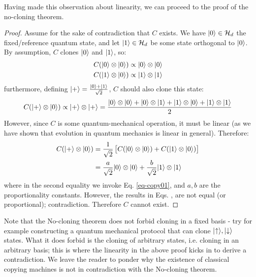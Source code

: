 Having made this observation about linearity, we can proceed to the proof of the no-cloning theorem.
\begin{proof}
    Assume for the sake of contradiction that $C$ exists. We have $\lvert 0 \rangle \in \mathcal{H}_d$ the fixed/reference quantum state, and let $\lvert 1 \rangle \in \mathcal{H}_d$ be some state orthogonal to $\lvert 0 \rangle$. By assumption, $C$ clones $\lvert 0 \rangle$ and $\lvert 1 \rangle$, so:
    \begin{equation}\label{eq-copy01}
        \begin{split}
            C(\lvert 0 \rangle \otimes \lvert 0 \rangle) &\propto \lvert 0 \rangle \otimes \lvert 0 \rangle
            \\ C(\lvert 1 \rangle \otimes \lvert 0 \rangle) &\propto \lvert 1 \rangle \otimes \lvert 1 \rangle
        \end{split}
    \end{equation}
    furthermore, defining $\lvert + \rangle = \frac{\lvert 0 \rangle + \lvert 1 \rangle}{\sqrt{2}}$, $C$ should also clone this state:
    \begin{equation}\label{eq-cloneplus1}
        C(\lvert + \rangle \otimes \lvert 0 \rangle) \propto \lvert + \rangle \otimes \lvert + \rangle = \frac{\lvert 0 \rangle \otimes \lvert 0 \rangle + \lvert 0 \rangle \otimes \lvert 1 \rangle + \lvert 1 \rangle \otimes \lvert 0 \rangle + \lvert 1 \rangle \otimes \lvert 1 \rangle}{2}
    \end{equation}
    However, since $C$ is some quantum-mechanical operation, it must be linear (as we have shown that evolution in quantum mechanics is linear in general). Therefore:
    \begin{equation}\label{eq-cloneplus2}
        \begin{split}
            C(\lvert + \rangle \otimes \lvert 0 \rangle) &= \frac{1}{\sqrt{2}}\left[C(\lvert 0 \rangle \otimes \lvert 0 \rangle) + C(\lvert 1 \rangle \otimes \lvert 0 \rangle)\right]
            \\ &= \frac{a}{\sqrt{2}}\lvert 0 \rangle \otimes \lvert 0 \rangle + \frac{b}{\sqrt{2}}\lvert 1 \rangle \otimes \lvert 1 \rangle
        \end{split}
    \end{equation}
    where in the second equality we invoke Eq. \eqref{eq-copy01}, and $a, b$ are the proportionality constants. However, the results in Eqs. \label{eq-cloneplus1}, \label{eq-cloneplus2} are not equal (or proportional); contradiction. Therefore $C$ cannot exist.
\end{proof}

Note that the No-cloning theorem does not forbid cloning in a fixed basis - try for example constructing a quantum mechanical protocol that can clone $\lvert \uparrow \rangle, \lvert \downarrow \rangle$ states. What it does forbid is the cloning of arbitrary states, i.e. cloning in an arbitrary basis; this is where the linearity in the above proof kicks in to derive a contradiction. We leave the reader to ponder why the existence of classical copying machines is not in contradiction with the No-cloning theorem.

